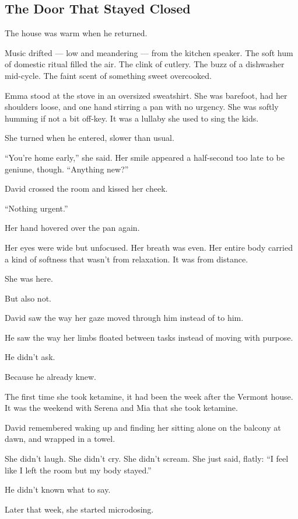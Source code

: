 
\subsection{The Door That Stayed Closed}

The house was warm when he returned.

Music drifted --- low and meandering --- from the kitchen speaker.
The soft hum of domestic ritual filled the air.
The clink of cutlery. 
The buzz of a 
dishwasher mid-cycle. 
The faint scent of something sweet overcooked. 

Emma stood at the stove in an oversized sweatshirt. 
She was barefoot, had her shoulders loose, and one hand 
stirring a pan with no urgency. 
She was softly humming if not a bit off-key. It was a lullaby she used to sing the kids.

She turned when he entered, slower than usual.

``You’re home early,'' she said. 
Her smile appeared a half-second too late to be geniune, though. 
``Anything new?''

David crossed the room and kissed her cheek.

``Nothing urgent.''

Her hand hovered over the pan again.

Her eyes were wide but unfocused. 
Her breath was even. 
Her entire body carried a kind of softness that wasn’t from relaxation.
It was from distance. 

She was here.

But also not.

David saw the way her gaze moved through him instead of to him. 

He saw the way her limbs floated between tasks instead of 
moving with purpose.

He didn’t ask.

Because he already knew.

The first time she took ketamine, it had been the week after the Vermont house.
It was the weekend with Serena and Mia that she took ketamine. 

David remembered waking up and finding her sitting alone on the balcony at dawn, 
and wrapped in a towel. 

She didn't laugh. She didn’t cry. She didn’t scream. She just said, flatly:
``I feel like I left the room but my body stayed.''

He didn't known what to say.

Later that week, she started microdosing. 

